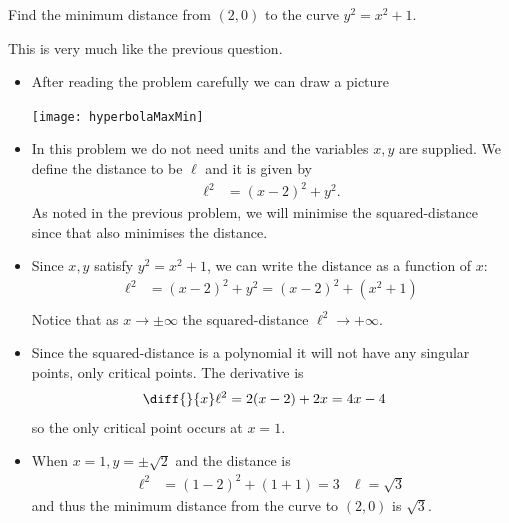 \begin{eg}\label{APPglobalMaxMinDist}
 Find the minimum distance from $(2,0)$ to the curve $y^2=x^2+1$.

\soln This is very much like the previous question.
\begin{itemize}
 \item After reading the problem carefully we can draw a picture
\begin{efig}
\begin{center}
   \texttt{[image: hyperbolaMaxMin]}
\end{center}
\end{efig}
\item In this problem we do not need units and the variables $x,y$ are supplied. We define
the distance to be $\ell$ and it is given by
\begin{align*}
  \ell^2 &= (x-2)^2+y^2.
\end{align*}
As noted in the previous problem, we will minimise the squared-distance since that also
minimises the distance.
\item Since $x,y$ satisfy $y^2=x^2+1$, we can write the distance as a function of $x$:
\begin{align*}
  \ell^2 &= (x-2)^2 + y^2 = (x-2)^2 + (x^2+1)\\
\end{align*}
Notice that as $x \to \pm \infty$ the squared-distance $\ell^2 \to +\infty$.

\item Since the squared-distance is a polynomial it will not have any singular points,
only critical points. The derivative is
\begin{align*}
  \diff{}{x} \ell^2 &= 2(x-2) + 2x = 4x-4
\end{align*}
so the only critical point occurs at $x=1$.

\item When $x=1, y=\pm \sqrt{2}$ and the distance is
\begin{align*}
  \ell^2 &= (1-2)^2 + (1+1) = 3 & \ell=\sqrt{3}
\end{align*}
and thus the minimum distance from the curve to $(2,0)$ is $\sqrt{3}$.
\end{itemize}
\end{eg}

